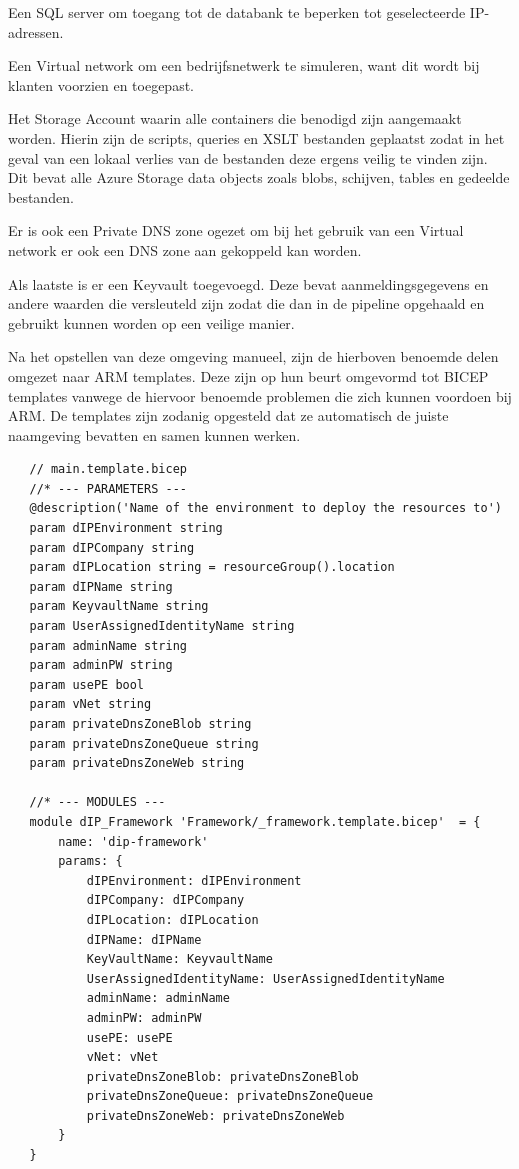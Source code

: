 Een SQL server om toegang tot de databank te beperken tot geselecteerde IP-adressen.

Een Virtual network om een bedrijfsnetwerk te simuleren, want dit wordt bij klanten voorzien en toegepast.

Het Storage Account waarin alle containers die benodigd zijn aangemaakt worden. Hierin zijn de scripts, queries en XSLT bestanden geplaatst zodat in het geval van een lokaal verlies van de bestanden deze ergens veilig te vinden zijn. Dit bevat alle Azure Storage data objects zoals blobs, schijven, tables en gedeelde bestanden.

Er is ook een Private DNS zone ogezet om bij het gebruik van een Virtual network er ook een DNS zone aan gekoppeld kan worden.

Als laatste is er een Keyvault toegevoegd. Deze bevat aanmeldingsgegevens en andere waarden die versleuteld zijn zodat die dan in de pipeline opgehaald en gebruikt kunnen worden op een veilige manier.

Na het opstellen van deze omgeving manueel, zijn de hierboven benoemde delen omgezet naar ARM templates. Deze zijn op hun beurt omgevormd tot BICEP templates vanwege de hiervoor benoemde problemen die zich kunnen voordoen bij ARM. De templates zijn zodanig opgesteld dat ze automatisch de juiste naamgeving bevatten en samen kunnen werken.

\begin{lstlisting}
   // main.template.bicep
   //* --- PARAMETERS ---
   @description('Name of the environment to deploy the resources to')
   param dIPEnvironment string
   param dIPCompany string
   param dIPLocation string = resourceGroup().location
   param dIPName string
   param KeyvaultName string
   param UserAssignedIdentityName string
   param adminName string
   param adminPW string
   param usePE bool
   param vNet string
   param privateDnsZoneBlob string
   param privateDnsZoneQueue string
   param privateDnsZoneWeb string

   //* --- MODULES ---
   module dIP_Framework 'Framework/_framework.template.bicep'  = {
       name: 'dip-framework'
       params: {
           dIPEnvironment: dIPEnvironment
           dIPCompany: dIPCompany
           dIPLocation: dIPLocation
           dIPName: dIPName
           KeyVaultName: KeyvaultName
           UserAssignedIdentityName: UserAssignedIdentityName
           adminName: adminName
           adminPW: adminPW
           usePE: usePE
           vNet: vNet
           privateDnsZoneBlob: privateDnsZoneBlob
           privateDnsZoneQueue: privateDnsZoneQueue
           privateDnsZoneWeb: privateDnsZoneWeb
       }
   }

\end{lstlisting}

